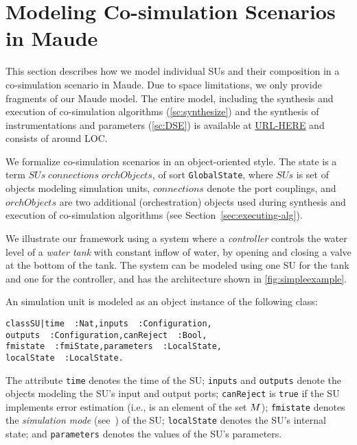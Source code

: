 
\section{Modeling Co-simulation Scenarios in Maude}
\label{sec:model}

This section describes how we model  individual SUs and their
composition in a co-simulation scenario in Maude.
%
Due to space limitations, we only provide fragments of our Maude
model. 
The entire model, including the synthesis and execution of co-simulation
algorithms (\cref{sc:synthesize}) and the synthesis of
instrumentations and parameters (\cref{sc:DSE})  is
available at \url{URL-HERE}  and consists of around 
 LOC. 

We formalize  co-simulation scenarios in an object-oriented style. The
 state is a term
 \texttt{}$\mathit{SUs}\;\mathit{connections}\;\mathit{orchObjects}$\texttt{}, 
 of sort \texttt{GlobalState}, 
 where $\mathit{SUs}$ is set of objects modeling simulation units,
$\mathit{connections}$ denote the port couplings, and
$\mathit{orchObjects}$ are two additional (orchestration) objects used
during synthesis and execution of co-simulation algorithms (see
Section~\ref{sec:executing-alg}). 

We illustrate our  framework using a system where a
\emph{controller} 
controls the water level of a \emph{water tank} with  constant inflow
of water,  by opening and closing a valve
at the bottom of the tank. 
The system can be modeled using  one SU for the tank and one for
the controller, and has the architecture shown in
\cref{fig:simpleexample}.

An simulation unit  is modeled as an object instance of the following
class: %
\small
\begin{alltt}
class SU | time\,\,: Nat,                inputs\,\,: Configuration,
           outputs\,\,: Configuration,   canReject\,\,: Bool,
           fmistate\,\,: fmiState,       parameters\,\,: LocalState,
           localState\,\,: LocalState .
\end{alltt}
\normalsize

\noindent The attribute \texttt{time} denotes the time of the SU; 
\texttt{inputs} and \texttt{outputs} denote the objects modeling the
SU's input and output 
ports; \texttt{canReject}  is \texttt{true} if  the SU
implements error estimation (i.e., is an element of the set
$M$);  
\texttt{fmistate} denotes the \emph{simulation mode}
(see~\cite{FMI2014}) of the SU; \texttt{localState} denotes the SU's internal
state; and \texttt{parameters} denotes the values of the SU's
parameters. 

